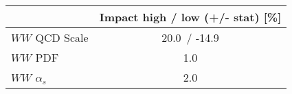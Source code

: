\begin{tabular}{| l || c | }
\hline 
& Impact high / low (+/- stat) [\%] \tabularnewline
\hline
$WW$ QCD Scale & 20.0\, / -14.9 \tabularnewline
$WW$ PDF & 1.0 \tabularnewline
$WW$ $\alpha_s$ & 2.0 \tabularnewline
\hline
\end{tabular}
